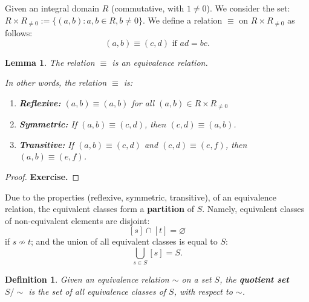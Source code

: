 \documentclass[a4paper,12pt]{report}
\newcounter{statement}
\numberwithin{statement}{chapter}
\newtheorem{defn}[statement]{Definition}
\newtheorem{lemma}[statement]{Lemma}
\numberwithin{equation}{chapter}
\numberwithin{section}{chapter}
\numberwithin{subsection}{section}
\begin{document}
Given an integral domain $R$ (commutative, with $1 \neq 0$).  We consider the set:
$R \times R_{\neq 0} := \{(a, b) : a, b \in R, b\neq 0\}$.
We define a relation $\equiv$ on $R \times R_{\neq 0}$ as follows:
\[
(a, b) \equiv (c, d) \text{ if } ad = bc.
\]
\begin{lemma}

The relation $\equiv$ is an equivalence relation.




In other words, the relation $\equiv$ is:
\begin{enumerate}
\item  {\bf Reflexive:} 
$(a, b) \equiv (a, b)$ for all $(a, b) \in R\times R_{\neq 0}$

\item  {\bf Symmetric:} 
If $(a, b) \equiv (c, d)$, then $(c, d) \equiv (a, b)$.

\item  {\bf Transitive:} 
If $(a, b) \equiv (c, d)$ and $(c, d) \equiv (e, f)$,
then $(a, b) \equiv (e, f)$.
\end{enumerate}

\end{lemma}
\begin{proof}

 {\bf Exercise.} 

\end{proof}




















Due to the properties (reflexive, symmetric, transitive),
of an equivalence relation, the equivalent classes form a  {\bf partition}  of
$S$.  Namely, equivalent classes of non-equivalent elements are disjoint:
\[
[s] \cap [t] = \varnothing
\]
if $s \not\sim t$;
and the union of all equivalent classes is equal to $S$:
\[
\bigcup_{s \in S} [s] = S.
\]



\begin{defn}

Given an equivalence relation $\sim$ on a set $S$,
the  {\bf quotient set}  $S/\sim$ is the set of all equivalence classes
of $S$, with respect to $\sim$.

\end{defn}
\end{document}
